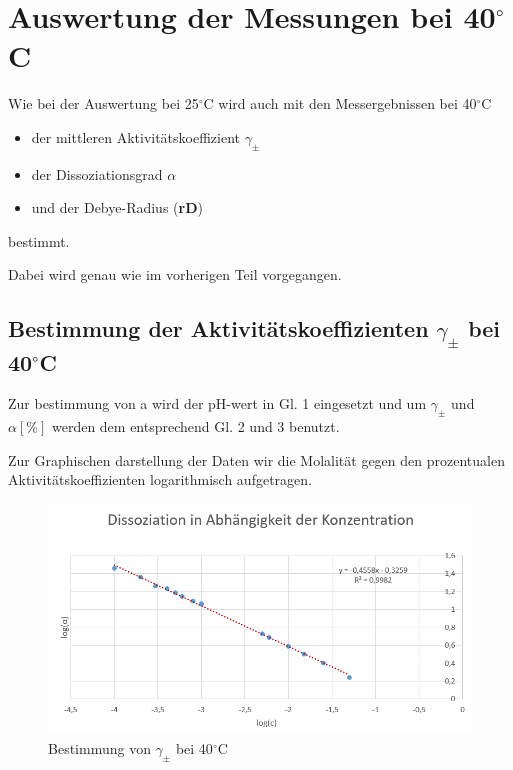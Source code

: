 \section{Auswertung der Messungen bei 40$^\circ$C}

Wie bei der Auswertung bei 25$^\circ$C wird auch mit den Messergebnissen bei 40$^\circ$C 

\begin{itemize}
    \item der mittleren Aktivitätskoeffizient $\gamma_\pm$
    \item der Dissoziationsgrad $\alpha$
    \item und der Debye-Radius (\textbf{rD})
\end{itemize}
bestimmt.

Dabei wird genau wie im vorherigen Teil vorgegangen.

\subsection{Bestimmung der Aktivitätskoeffizienten $\gamma_\pm$ bei 40$^\circ$C}

Zur bestimmung von a wird der pH-wert in Gl. 1 eingesetzt und um $\gamma _\pm$ und $\alpha[\%]$ werden dem entsprechend Gl. 2 und 3 benutzt.

 

Zur Graphischen darstellung der Daten wir die Molalität gegen den prozentualen Aktivitätskoeffizienten logarithmisch aufgetragen.


\begin{figure}[H]
    \centering
    \includegraphics[scale=.7]{../src/img/graph1_40C.png}
    \caption{Bestimmung von $\gamma_\pm$ bei 40$^\circ$C}
\end{figure}

